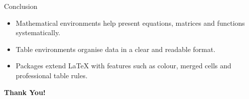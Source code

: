 \documentclass[aspectratio=169]{beamer}
\begin{document}
	\begin{frame}{Conclusion}
		\begin{itemize}
			\item Mathematical environments help present equations, matrices and functions systematically.
			\item Table environments organise data in a clear and readable format.
			\item Packages extend LaTeX with features such as colour, merged cells and professional table rules.
		\end{itemize}
		
		\vfill
		\begin{center}
			\Large\textbf{Thank You!}
		\end{center}
	\end{frame}
	
\end{document}

